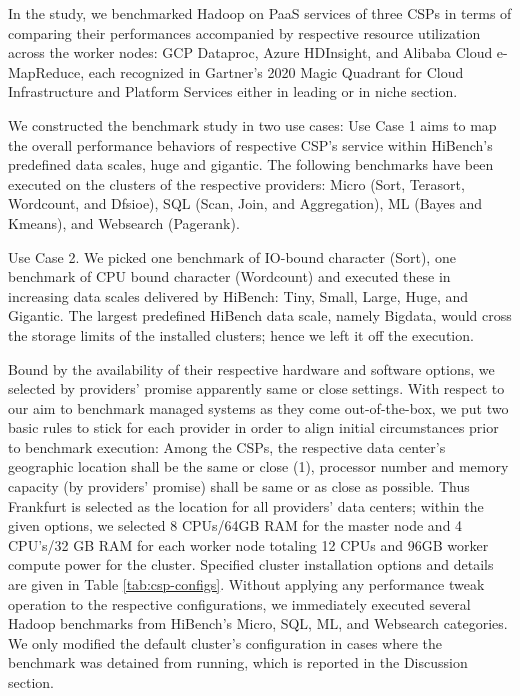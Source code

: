 \documentclass[review]{elsarticle}
\begin{document}
In the study, we benchmarked Hadoop on PaaS services of three CSPs in terms of comparing their performances accompanied by respective resource utilization across the worker nodes: GCP Dataproc, Azure HDInsight, and Alibaba Cloud e-MapReduce, each recognized in Gartner's 2020 Magic Quadrant for Cloud Infrastructure and Platform Services \cite{noauthor_gartner_nodate} either in leading or in niche section.

We constructed the benchmark study in two use cases: Use Case 1 aims to map the overall performance behaviors of respective CSP's service within HiBench's predefined data scales, huge and gigantic. The following benchmarks have been executed on the clusters of the respective providers: Micro (Sort, Terasort, Wordcount, and Dfsioe), SQL (Scan, Join, and Aggregation), ML (Bayes and Kmeans), and Websearch (Pagerank).

Use Case 2. We picked one benchmark of IO-bound character (Sort), one benchmark of CPU bound character (Wordcount) and executed these in increasing data scales delivered by HiBench: Tiny, Small, Large, Huge, and Gigantic. The largest predefined HiBench data scale, namely Bigdata, would cross the storage limits of the installed clusters; hence we left it off the execution.

Bound by the availability of their respective hardware and software options, we selected by providers' promise apparently same or close settings. With respect to our aim to benchmark managed systems as they come out-of-the-box, we put two basic rules to stick for each provider in order to align initial circumstances prior to benchmark execution: Among the CSPs, the respective data center's geographic location shall be the same or close (1), processor number and memory capacity (by providers' promise) shall be same or as close as possible. Thus Frankfurt is selected as the location for all providers' data centers; within the given options, we selected 8 CPUs/64GB RAM for the master node and 4 CPU's/32 GB RAM for each worker node totaling 12 CPUs and 96GB worker compute power for the cluster. Specified cluster installation options and details are given in Table \ref{tab:csp-configs}. Without applying any performance tweak operation to the respective configurations, we immediately executed several Hadoop benchmarks from HiBench's Micro, SQL, ML, and Websearch categories. We only modified the default cluster's configuration in cases where the benchmark was detained from running, which is reported in the Discussion section.
\end{document}
